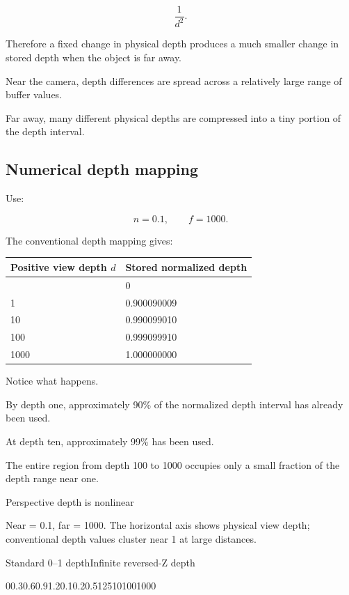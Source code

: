 \[
 \frac1{d^2}.
\]

Therefore a fixed change in physical depth produces a much smaller change in stored depth when the object is far away.

Near the camera, depth differences are spread across a relatively large range of buffer values.

Far away, many different physical depths are compressed into a tiny portion of the depth interval.

\subsection{Numerical depth mapping}\label{02-foundations-ii-ch033-numerical-depth-mapping}

\hypertarget{02-foundations-ii-ch033-numerical-depth-mapping}{}

Use:

\[
 n=0.1,\qquad f=1000.
\]

The conventional depth mapping gives:

{\def\LTcaptype{none} %
\begin{longtable}[]{@{}ll@{}}
\toprule\noalign{}
Positive view depth \(d\) & Stored normalized depth \\
\midrule\noalign{}
\endhead
\bottomrule\noalign{}
\endlastfoot
0.1 & 0 \\
1 & 0.900090009 \\
10 & 0.990099010 \\
100 & 0.999099910 \\
1000 & 1.000000000 \\
\end{longtable}
}

Notice what happens.

By depth one, approximately 90\% of the normalized depth interval has already been used.

At depth ten, approximately 99\% has been used.

The entire region from depth 100 to 1000 occupies only a small fraction of the depth range near one.

Perspective depth is nonlinear

Near = 0.1, far = 1000. The horizontal axis shows physical view depth; conventional depth values cluster near 1 at large distances.

Standard 0--1 depthInfinite reversed-Z depth

00.30.60.91.20.10.20.5125101001000

